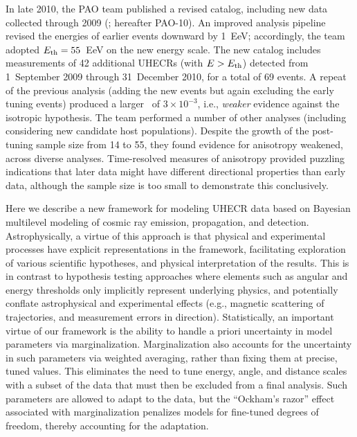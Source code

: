 
In late 2010, the PAO team published a revised catalog, including new data
collected through 2009 (\cite{PAO10-AnisoUpdate}; hereafter PAO-10).  An
improved analysis pipeline revised the energies of earlier events downward
by 1~EeV; accordingly, the team adopted $E_{\rm th} = 55$~EeV on the new energy
scale.  The new catalog includes measurements of 42 additional UHECRs (with
$E>E_{\rm th}$) detected from 1~September 2009 through 31~December 2010, for a
total of 69 events.  A repeat of the previous analysis (adding the new
events but again excluding the early tuning events) produced a larger \pval\
of $3\times 10^{-3}$, i.e., {\em weaker} evidence against the isotropic
hypothesis.  The team performed a number of other analyses (including
considering new candidate host populations).  Despite the growth of the
post-tuning sample size from 14 to 55, they found evidence for anisotropy
weakened, across diverse analyses.  Time-resolved measures of anisotropy
provided puzzling indications that later data might have different
directional properties than early data, although the sample size is too
small to demonstrate this conclusively.

Here we describe a new framework for modeling UHECR data based on Bayesian
multilevel modeling of cosmic ray emission, propagation, and detection.
Astrophysically, a virtue of this approach is that physical and experimental
processes have explicit representations in the framework, facilitating
exploration of various scientific hypotheses, and physical interpretation of
the results.  This is in contrast to
hypothesis testing approaches where elements such as angular and energy
thresholds only implicitly represent underlying physics, and potentially
conflate astrophysical and experimental effects (e.g., magnetic scattering
of trajectories, and measurement errors in direction).
Statistically, an important virtue of our framework is the ability to
handle a priori uncertainty in model parameters via marginalization. 
Marginalization also accounts for the uncertainty in such parameters via
weighted averaging, rather than fixing them at precise, tuned values.  This
eliminates the need to tune energy, angle, and distance scales with a subset
of the data that must then be excluded from a final analysis.  Such parameters
are allowed to adapt to the data, but the ``Ockham's razor'' effect associated
with marginalization penalizes models for fine-tuned degrees of freedom,
thereby accounting for the adaptation.

